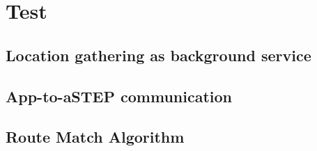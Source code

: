 \section{Test}


\subsection{Location gathering as background service}


\subsection{App-to-aSTEP communication}


\subsection{Route Match Algorithm}



